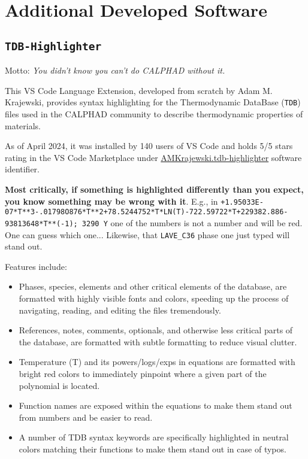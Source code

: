 \chapter{Additional Developed Software} \label{chap:othersoft}


\section{\texttt{TDB-Highlighter}} \label{osoft:sec:tdbhighlighter}

\hspace{24pt} Motto: \textit{You didn't know you can't do CALPHAD without it.}

This VS Code Language Extension, developed from scratch by Adam M. Krajewski, provides syntax highlighting for the Thermodynamic DataBase (\texttt{TDB}) files used in the CALPHAD community to describe thermodynamic properties of materials. 

As of April 2024, it was installed by 140 users of VS Code and holds 5/5 stars rating in the VS Code Marketplace under \href{https://marketplace.visualstudio.com/items?itemName=amkrajewski.tdb-highlighter#review-details}{AMKrajewski.tdb-highlighter} software identifier.

\textbf{Most critically, if something is highlighted differently than you expect, you know something may be wrong with it}. E.g., in \texttt{+1.95033E-07*T**3-.01798O876*T**2+78.5244752*T*LN(T)-722.59722*T+229382.886-93813648*T**(-1); 3290 Y} one of the numbers is not a number and will be red. One can guess which one... Likewise, that \texttt{LAVE\_C36} phase one just typed will stand out.

Features include:
\begin{itemize}
    \item Phases, species, elements and other critical elements of the database, are formatted with highly visible fonts and colors, speeding up the process of navigating, reading, and editing the files tremendously.
    \item References, notes, comments, optionals, and otherwise less critical parts of the database, are formatted with subtle formatting to reduce visual clutter.
    \item Temperature (T) and its powers/logs/exps in equations are formatted with bright red colors to immediately pinpoint where a given part of the polynomial is located.
    \item Function names are exposed within the equations to make them stand out from numbers and be easier to read.
    \item A number of TDB syntax keywords are specifically highlighted in neutral colors matching their functions to make them stand out in case of typos.
\end{itemize}

